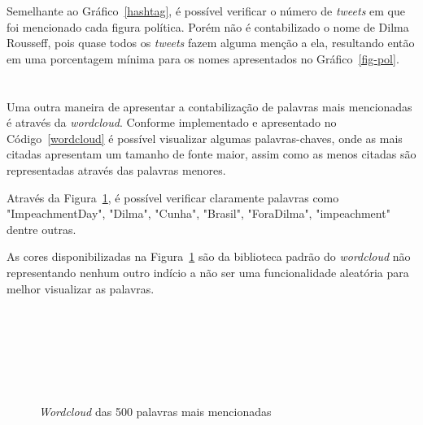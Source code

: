Semelhante ao Gráfico~\ref{hashtag}, é possível verificar o número de \textit{tweets} em que foi mencionado cada figura política. Porém não é contabilizado o nome de Dilma Rousseff, pois quase todos os \textit{tweets} fazem alguma menção a ela, resultando então em uma porcentagem mínima para os nomes apresentados no Gráfico~\ref{fig-pol}. \\ \\ \\

Uma outra maneira de apresentar a contabilização de palavras mais mencionadas é através da \textit{wordcloud}. Conforme implementado e apresentado no Código~\ref{wordcloud} é possível visualizar algumas palavras-chaves, onde as mais citadas apresentam um tamanho de fonte maior, assim como as menos citadas são representadas através das palavras menores.

Através da Figura~\ref{fig:wordcloud}, é possível verificar claramente palavras como "ImpeachmentDay", "Dilma", "Cunha", "Brasil", "ForaDilma", "impeachment" dentre outras.

As cores disponibilizadas na Figura~\ref{fig:wordcloud} são da biblioteca padrão do \textit{wordcloud} não representando nenhum outro indício a não ser uma funcionalidade aleatória para melhor visualizar as palavras. \\ \\ \\ \\ \\ \\ \\

\begin{figure}[h]
	\centering
	\caption{\textit{Wordcloud} das 500 palavras mais mencionadas}
	\vspace{-0.3cm}
	\label{fig:wordcloud}
\end{figure}


